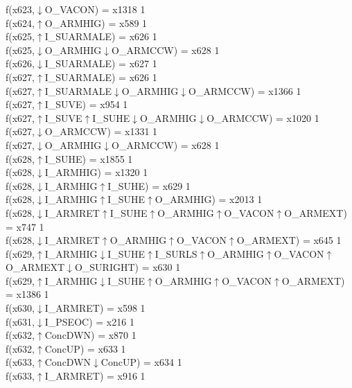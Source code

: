f(x623,$\downarrow$O\_VACON) = x1318 {1} \\
f(x624,$\uparrow$O\_ARMHIG) = x589 {1} \\
f(x625,$\uparrow$I\_SUARMALE) = x626 {1} \\
f(x625,$\downarrow$O\_ARMHIG$\downarrow$O\_ARMCCW) = x628 {1} \\
f(x626,$\downarrow$I\_SUARMALE) = x627 {1} \\
f(x627,$\uparrow$I\_SUARMALE) = x626 {1} \\
f(x627,$\uparrow$I\_SUARMALE$\downarrow$O\_ARMHIG$\downarrow$O\_ARMCCW) = x1366 {1} \\
f(x627,$\uparrow$I\_SUVE) = x954 {1} \\
f(x627,$\uparrow$I\_SUVE$\uparrow$I\_SUHE$\downarrow$O\_ARMHIG$\downarrow$O\_ARMCCW) = x1020 {1} \\
f(x627,$\downarrow$O\_ARMCCW) = x1331 {1} \\
f(x627,$\downarrow$O\_ARMHIG$\downarrow$O\_ARMCCW) = x628 {1} \\
f(x628,$\uparrow$I\_SUHE) = x1855 {1} \\
f(x628,$\downarrow$I\_ARMHIG) = x1320 {1} \\
f(x628,$\downarrow$I\_ARMHIG$\uparrow$I\_SUHE) = x629 {1} \\
f(x628,$\downarrow$I\_ARMHIG$\uparrow$I\_SUHE$\uparrow$O\_ARMHIG) = x2013 {1} \\
f(x628,$\downarrow$I\_ARMRET$\uparrow$I\_SUHE$\uparrow$O\_ARMHIG$\uparrow$O\_VACON$\uparrow$O\_ARMEXT) = x747 {1} \\
f(x628,$\downarrow$I\_ARMRET$\uparrow$O\_ARMHIG$\uparrow$O\_VACON$\uparrow$O\_ARMEXT) = x645 {1} \\
f(x629,$\uparrow$I\_ARMHIG$\downarrow$I\_SUHE$\uparrow$I\_SURLS$\uparrow$O\_ARMHIG$\uparrow$O\_VACON$\uparrow$O\_ARMEXT$\downarrow$O\_SURIGHT) = x630 {1} \\
f(x629,$\uparrow$I\_ARMHIG$\downarrow$I\_SUHE$\uparrow$O\_ARMHIG$\uparrow$O\_VACON$\uparrow$O\_ARMEXT) = x1386 {1} \\
f(x630,$\downarrow$I\_ARMRET) = x598 {1} \\
f(x631,$\downarrow$I\_PSEOC) = x216 {1} \\
f(x632,$\uparrow$ConcDWN) = x870 {1} \\
f(x632,$\uparrow$ConcUP) = x633 {1} \\
f(x633,$\uparrow$ConcDWN$\downarrow$ConcUP) = x634 {1} \\
f(x633,$\uparrow$I\_ARMRET) = x916 {1} \\

